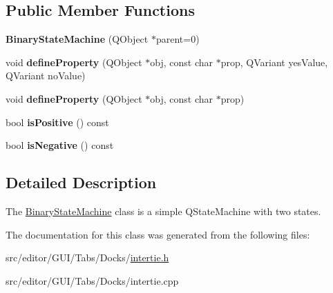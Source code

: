 \subsection*{\-Public \-Member \-Functions}
\begin{DoxyCompactItemize}
\item 
\hypertarget{class_binary_state_machine_a9e022d1bf8c0d7c2c7916c6b329d8891}{{\bfseries \-Binary\-State\-Machine} (\-Q\-Object $\ast$parent=0)}\label{class_binary_state_machine_a9e022d1bf8c0d7c2c7916c6b329d8891}

\item 
\hypertarget{class_binary_state_machine_a7f9c62ef8512448a2e1afb38f29a7c0f}{void {\bfseries define\-Property} (\-Q\-Object $\ast$obj, const char $\ast$prop, \-Q\-Variant yes\-Value, \-Q\-Variant no\-Value)}\label{class_binary_state_machine_a7f9c62ef8512448a2e1afb38f29a7c0f}

\item 
\hypertarget{class_binary_state_machine_a5996c6d83be3422a74e9bf26c30958ca}{void {\bfseries define\-Property} (\-Q\-Object $\ast$obj, const char $\ast$prop)}\label{class_binary_state_machine_a5996c6d83be3422a74e9bf26c30958ca}

\item 
\hypertarget{class_binary_state_machine_a239a6f3c579accb8bda78d6b99fb66b2}{bool {\bfseries is\-Positive} () const }\label{class_binary_state_machine_a239a6f3c579accb8bda78d6b99fb66b2}

\item 
\hypertarget{class_binary_state_machine_af943aaf719dffd6b61a76da6d10f6dd2}{bool {\bfseries is\-Negative} () const }\label{class_binary_state_machine_af943aaf719dffd6b61a76da6d10f6dd2}

\end{DoxyCompactItemize}


\subsection{\-Detailed \-Description}
\-The \hyperlink{class_binary_state_machine}{\-Binary\-State\-Machine} class is a simple \-Q\-State\-Machine with two states. 

\-The documentation for this class was generated from the following files\-:\begin{DoxyCompactItemize}
\item 
src/editor/\-G\-U\-I/\-Tabs/\-Docks/\hyperlink{intertie_8h}{intertie.\-h}\item 
src/editor/\-G\-U\-I/\-Tabs/\-Docks/intertie.\-cpp\end{DoxyCompactItemize}
